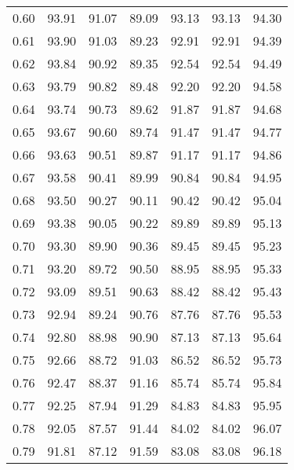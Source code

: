 \begin{tabular}{|c|c|c|c|c|c|c|}
      0.60 &     93.91 &     91.07 &      89.09 &   93.13 &      93.13 &         94.30 \\
      0.61 &     93.90 &     91.03 &      89.23 &   92.91 &      92.91 &         94.39 \\
      0.62 &     93.84 &     90.92 &      89.35 &   92.54 &      92.54 &         94.49 \\
      0.63 &     93.79 &     90.82 &      89.48 &   92.20 &      92.20 &         94.58 \\
      0.64 &     93.74 &     90.73 &      89.62 &   91.87 &      91.87 &         94.68 \\
      0.65 &     93.67 &     90.60 &      89.74 &   91.47 &      91.47 &         94.77 \\
      0.66 &     93.63 &     90.51 &      89.87 &   91.17 &      91.17 &         94.86 \\
      0.67 &     93.58 &     90.41 &      89.99 &   90.84 &      90.84 &         94.95 \\
      0.68 &     93.50 &     90.27 &      90.11 &   90.42 &      90.42 &         95.04 \\
      0.69 &     93.38 &     90.05 &      90.22 &   89.89 &      89.89 &         95.13 \\
      0.70 &     93.30 &     89.90 &      90.36 &   89.45 &      89.45 &         95.23 \\
      0.71 &     93.20 &     89.72 &      90.50 &   88.95 &      88.95 &         95.33 \\
      0.72 &     93.09 &     89.51 &      90.63 &   88.42 &      88.42 &         95.43 \\
      0.73 &     92.94 &     89.24 &      90.76 &   87.76 &      87.76 &         95.53 \\
      0.74 &     92.80 &     88.98 &      90.90 &   87.13 &      87.13 &         95.64 \\
      0.75 &     92.66 &     88.72 &      91.03 &   86.52 &      86.52 &         95.73 \\
      0.76 &     92.47 &     88.37 &      91.16 &   85.74 &      85.74 &         95.84 \\
      0.77 &     92.25 &     87.94 &      91.29 &   84.83 &      84.83 &         95.95 \\
      0.78 &     92.05 &     87.57 &      91.44 &   84.02 &      84.02 &         96.07 \\
      0.79 &     91.81 &     87.12 &      91.59 &   83.08 &      83.08 &         96.18 \\

\end{tabular}
